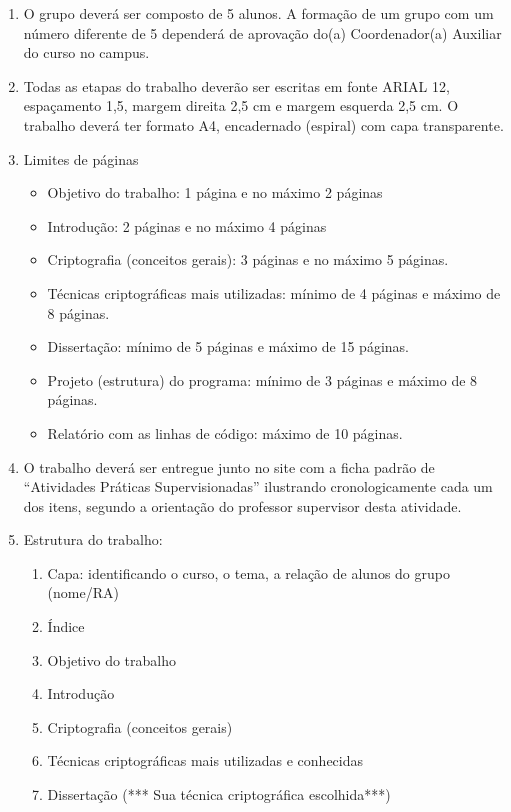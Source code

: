 \documentclass[12pt]{article}
\begin{document}
\renewcommand{\labelenumi}{\arabic{enumi}.}
\renewcommand{\labelenumii}{\arabic{enumi}.\arabic{enumii}.}
\renewcommand{\labelenumiii}{\arabic{enumi}.\arabic{enumii}.\arabic{enumiii}.}
\begin{enumerate}
\item O grupo deverá ser composto de 5 alunos. A formação de um grupo com um
número diferente de 5 dependerá de aprovação do(a) Coordenador(a) Auxiliar do
curso no campus.
\item Todas as etapas do trabalho deverão ser escritas em fonte ARIAL 12,
espaçamento 1,5, margem direita 2,5 cm e margem esquerda 2,5 cm. O trabalho
deverá ter formato A4, encadernado (espiral) com capa transparente.
\item Limites de páginas
\begin{itemize}
\item Objetivo do trabalho: 1 página e no máximo 2 páginas
\item Introdução: 2 páginas e no máximo 4 páginas
\item Criptografia (conceitos gerais): 3 páginas e no máximo 5 páginas.
\item Técnicas criptográficas mais utilizadas: mínimo de 4 páginas e máximo de 8
páginas.
\item Dissertação: mínimo de 5 páginas e máximo de 15 páginas.
\item Projeto (estrutura) do programa: mínimo de 3 páginas e máximo de 8 páginas.
\item Relatório com as linhas de código: máximo de 10 páginas.
\end{itemize}
\item O trabalho deverá ser entregue junto no site com a ficha padrão de “Atividades Práticas
Supervisionadas” ilustrando cronologicamente cada um dos itens, segundo a
orientação do professor supervisor desta atividade.
\item Estrutura do trabalho:

\begin{enumerate}

\item Capa: identificando o curso, o tema, a relação de alunos do grupo (nome/RA)
\item Índice
\item Objetivo do trabalho
\item Introdução
\item Criptografia (conceitos gerais)
\item Técnicas criptográficas mais utilizadas e conhecidas
\item Dissertação (*** Sua técnica criptográfica escolhida***)
\begin{enumerate}


\end{enumerate}
\end{enumerate}
\end{enumerate}
\end{document}
